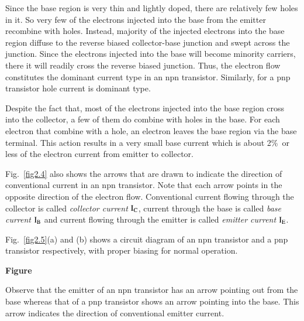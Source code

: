 Since the base region is very thin and lightly doped, there are relatively few holes in it. So very few of the electrons injected into the base from the emitter recombine with holes. Instead, majority of the injected electrons into the base region diffuse to the reverse biased collector-base junction and swept across the junction. Since the electrons injected into the base will become minority carriers, there it will readily cross the reverse biased junction. Thus, the electron flow constitutes the dominant current type in an npn transistor. Similarly, for a pnp transistor hole current is dominant type.

Despite the fact that, most of the electrons injected into the base region cross into the collector, a few of them do combine with holes in the base. For each electron that combine with a hole, an electron leaves the base region via the base terminal. This action results in a very small base current which is about 2\%\ or less of the electron current from emitter to collector.

Fig.~\ref{fig2.4} also shows the arrows that are drawn to indicate the direction of conventional current in an npn transistor. Note that each arrow points in the opposite direction of the electron flow. Conventional current flowing through the collector is called {\em collector current} $\textrm{I}_{\textrm{C}}$, current through the base is called {\em base current} $\textrm{I}_{\textrm{B}}$ and current flowing through the emitter is called {\em emitter current} $\textrm{I}_{\textrm{E}}$.

Fig.~\ref{fig2.5}(a) and (b) shows a circuit diagram of an npn transistor and a pnp transistor respectively, with proper biasing for normal operation.
\begin{center}
{\bf Figure}
\end{center}

Observe that the emitter of an npn transistor has an arrow pointing out from the base whereas that of a pnp transistor shows an arrow pointing into the base. This arrow indicates the direction of conventional emitter current.

